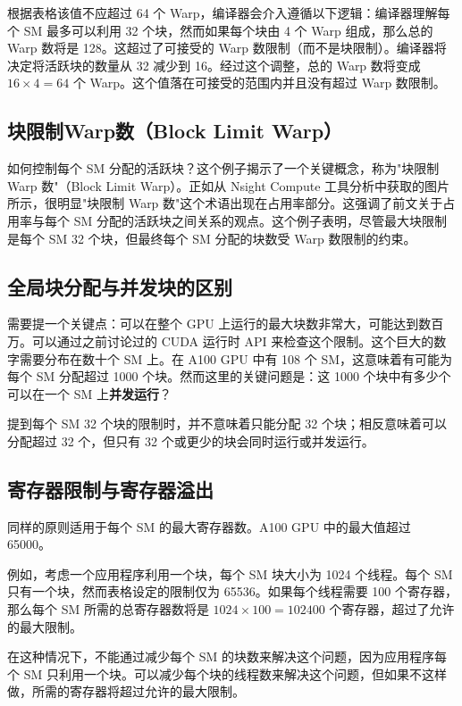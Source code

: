 根据表格该值不应超过 64 个 Warp，编译器会介入遵循以下逻辑：编译器理解每个 SM 最多可以利用 32 个块，然而如果每个块由 4 个 Warp 组成，那么总的 Warp 数将是 128。这超过了可接受的 Warp 数限制（而不是块限制）。编译器将决定将活跃块的数量从 32 减少到 16。经过这个调整，总的 Warp 数将变成 $16 \times 4 = 64$ 个 Warp。这个值落在可接受的范围内并且没有超过 Warp 数限制。

\subsection{块限制Warp数（Block Limit Warp）}

如何控制每个 SM 分配的活跃块？这个例子揭示了一个关键概念，称为"块限制 Warp 数"（Block Limit Warp）。正如从 Nsight Compute 工具分析中获取的图片所示，很明显"块限制 Warp 数"这个术语出现在占用率部分。这强调了前文关于占用率与每个 SM 分配的活跃块之间关系的观点。这个例子表明，尽管最大块限制是每个 SM 32 个块，但最终每个 SM 分配的块数受 Warp 数限制的约束。

\subsection{全局块分配与并发块的区别}

需要提一个关键点：可以在整个 GPU 上运行的最大块数非常大，可能达到数百万。可以通过之前讨论过的 CUDA 运行时 API 来检查这个限制。这个巨大的数字需要分布在数十个 SM 上。在 A100 GPU 中有 108 个 SM，这意味着有可能为每个 SM 分配超过 1000 个块。然而这里的关键问题是：这 1000 个块中有多少个可以在一个 SM 上\textbf{并发运行}？

提到每个 SM 32 个块的限制时，并不意味着只能分配 32 个块；相反意味着可以分配超过 32 个，但只有 32 个或更少的块会同时运行或并发运行。

\subsection{寄存器限制与寄存器溢出}

同样的原则适用于每个 SM 的最大寄存器数。A100 GPU 中的最大值超过 65000。

例如，考虑一个应用程序利用一个块，每个 SM 块大小为 1024 个线程。每个 SM 只有一个块，然而表格设定的限制仅为 65536。如果每个线程需要 100 个寄存器，那么每个 SM 所需的总寄存器数将是 $1024 \times 100 = 102400$ 个寄存器，超过了允许的最大限制。

在这种情况下，不能通过减少每个 SM 的块数来解决这个问题，因为应用程序每个 SM 只利用一个块。可以减少每个块的线程数来解决这个问题，但如果不这样做，所需的寄存器将超过允许的最大限制。

